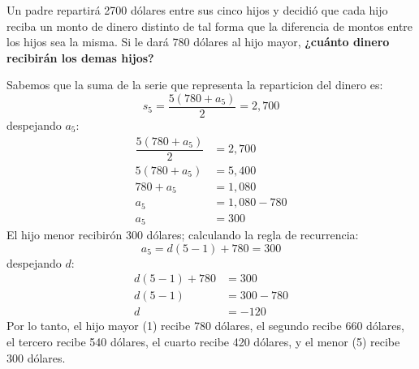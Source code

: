 Un padre repartirá 2700 dólares entre sus cinco hijos y decidió que cada hijo reciba un monto de dinero distinto de tal forma que la diferencia de montos entre los hijos sea la misma.
Si le dará 780 dólares al hijo mayor,
\textbf{¿cuánto dinero recibirán los demas hijos?}

\begin{solutionbox}{8cm}
    \begin{multicols}{2}
        Sabemos que la suma de la serie que representa la reparticion del dinero es:
        \[s_{5}=\dfrac{5(780+a_{5})}{2}=2,700\]
        despejando $a_5$:
        \begin{align*}
            \dfrac{5(780+a_{5})}{2} & =2,700     \\
            5(780+a_{5})            & =5,400     \\
            780+a_{5}               & = 1,080    \\
            a_{5}                   & =1,080-780 \\
            a_{5}                   & =300
        \end{align*}
        El hijo menor recibirón 300 dólares; calculando la regla de recurrencia:
        \[a_{5}=d(5-1)+780=300\]
        despejando $d$:
        \begin{align*}
            d(5-1)+ 780 & =300     \\
            d(5-1)      & =300-780 \\
            d           & =-120
        \end{align*}
        Por lo tanto, el hijo mayor (1) recibe 780 dólares, el segundo recibe 660 dólares, el tercero recibe 540 dólares, el cuarto recibe 420 dólares, y el menor (5) recibe 300 dólares.
    \end{multicols}
\end{solutionbox}